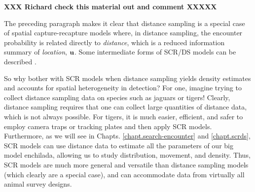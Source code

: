 {\bf XXX Richard check this material out and comment XXXXX }

The preceding paragraph makes it clear that distance sampling is a
special case of spatial capture-recapture models where, in distance sampling, the
encounter probability is related directly to {\it distance}, which is
a reduced information summary of {\it location}, ${\bf u}$. 
Some
intermediate forms of SCR/DS models can be described \citep{royle_etal:2011mee}.

So why bother with SCR models when distance sampling yields density
estimates and accounts for spatial heterogeneity in detection? For
one, imagine trying to collect distance sampling data on species such
as jaguars or tigers!  Clearly, distance sampling requires that one
can collect large quantities of distance data, which is not always
possible. For tigers, it is much easier, efficient, and safer to
employ camera traps or tracking plates and then apply SCR
models. Furthermore, as we will see in Chapts.
\ref{chapt.search-encounter} and \ref{chapt.scrds}, SCR models can use
distance data to estimate all the parameters of our big model
enchilada, allowing us to study distribution, movement, and
density. Thus, SCR models are much more general and versatile than
distance sampling models (which clearly are a special case), and can
accommodate data from virtually all animal survey designs.

